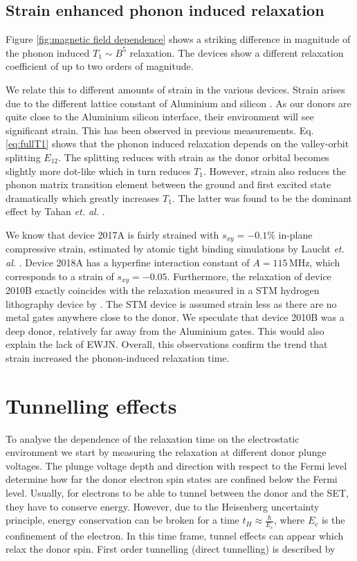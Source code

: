 \subsection{\label{sec:phonon} Strain enhanced phonon induced relaxation}

Figure \ref{fig:magnetic field dependence} shows a striking difference in magnitude of the phonon induced $T_1\sim B^5$ relaxation. The devices show a different relaxation coefficient of up to two orders of magnitude. 

We relate this to different amounts of strain in the various devices. Strain arises due to the different lattice constant of Aluminium and silicon \cite{Thorbeck}. As our donors are quite close to the Aluminium silicon interface, their environment will see significant strain. This has been observed in previous measurements\cite{Laucht2015, Asaad2018}. 
Eq. \ref{eq:fullT1} shows that the phonon induced relaxation depends on the valley-orbit splitting $E_{12}$. The splitting reduces with strain as the donor orbital becomes slightly more dot-like \cite{Tahan2002} which in turn reduces $T_1$. However, strain also reduces the phonon matrix transition element between the ground and first excited state dramatically which greatly increases $T_1$. The latter was found to be the dominant effect by Tahan \textit{et. al.} \cite{Tahan2002}.  
 
We know that device 2017A is fairly strained with $s_{xy}=-0.1\%$ in-plane compressive strain, estimated by atomic tight binding simulations by Laucht \textit{et. al.} \cite{Laucht2015}. Device 2018A has a hyperfine interaction constant of $A=115\,$MHz, which corresponds to a strain of $s_{xy}=-0.05$. Furthermore, the relaxation of device 2010B exactly coincides with the relaxation measured in a STM hydrogen lithography device by \cite{Watson2015}. The STM device is assumed strain less as there are no metal gates anywhere close to the donor. We speculate that device 2010B was a deep donor, relatively far away from the Aluminium gates. This would also explain the lack of EWJN. 
Overall, this observations confirm the trend that strain increased the phonon-induced relaxation time. 


\section{\label{sec:cotunnelling} Tunnelling effects}

To analyse the dependence of the relaxation time on the electrostatic environment we start by measuring the relaxation at different donor plunge voltages. The plunge voltage depth and direction with respect to the Fermi level determine how far the donor electron spin states are confined below the Fermi level. 
Usually, for electrons to be able to tunnel between the donor and the SET, they have to conserve energy. However, due to the Heisenberg uncertainty principle, energy conservation can be broken for a time $t_H\approx\frac{\hbar}{E_c}$, where $E_c$ is the confinement of the electron. In this time frame, tunnel effects can appear which relax the donor spin. First order tunnelling (direct tunnelling) is described by 

